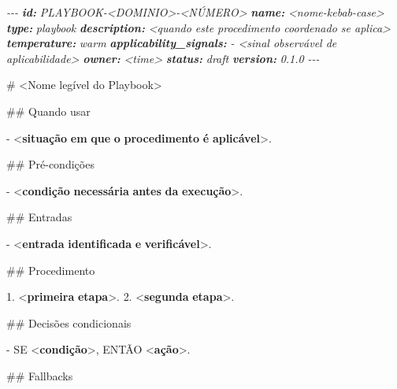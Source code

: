 \documentclass[
  10pt,
  a4paper,
  oneside]{book}
\newenvironment{Shaded}{}{}
\newcommand{\AnnotationTok}[1]{\textcolor[rgb]{0.38,0.63,0.69}{\textbf{\textit{#1}}}}
\newcommand{\CommentTok}[1]{\textcolor[rgb]{0.38,0.63,0.69}{\textit{#1}}}
\newcommand{\DataTypeTok}[1]{\textcolor[rgb]{0.56,0.13,0.00}{#1}}
\newcommand{\ErrorTok}[1]{\textcolor[rgb]{1.00,0.00,0.00}{\textbf{#1}}}
\newcommand{\FunctionTok}[1]{\textcolor[rgb]{0.02,0.16,0.49}{#1}}
\newcommand{\KeywordTok}[1]{\textcolor[rgb]{0.00,0.44,0.13}{\textbf{#1}}}
\newcommand{\NormalTok}[1]{#1}
\newcommand{\SpecialStringTok}[1]{\textcolor[rgb]{0.73,0.40,0.53}{#1}}
\renewenvironment{Shaded}{\begin{snugshade}}{\end{snugshade}}%
\begin{document}
\begin{Shaded}
\begin{Highlighting}[]
\CommentTok{{-}{-}{-}}
\AnnotationTok{id:}\CommentTok{ PLAYBOOK{-}\textless{}DOMINIO\textgreater{}{-}\textless{}NÚMERO\textgreater{}}
\AnnotationTok{name:}\CommentTok{ \textless{}nome{-}kebab{-}case\textgreater{}}
\AnnotationTok{type:}\CommentTok{ playbook}
\AnnotationTok{description:}\CommentTok{ \textless{}quando este procedimento coordenado se aplica\textgreater{}}
\AnnotationTok{temperature:}\CommentTok{ warm}
\AnnotationTok{applicability\_signals:}
\CommentTok{  {-} \textless{}sinal observável de aplicabilidade\textgreater{}}
\AnnotationTok{owner:}\CommentTok{ \textless{}time\textgreater{}}
\AnnotationTok{status:}\CommentTok{ draft}
\AnnotationTok{version:}\CommentTok{ 0.1.0}
\CommentTok{{-}{-}{-}}

\FunctionTok{\# \textless{}Nome legível do Playbook\textgreater{}}

\FunctionTok{\#\# Quando usar}

\SpecialStringTok{{-} }\DataTypeTok{\textless{}}\KeywordTok{situação} \ErrorTok{em} \ErrorTok{que} \ErrorTok{o} \ErrorTok{procedimento} \ErrorTok{é} \ErrorTok{aplicável}\DataTypeTok{\textgreater{}}\NormalTok{.}

\FunctionTok{\#\# Pré{-}condições}

\SpecialStringTok{{-} }\DataTypeTok{\textless{}}\KeywordTok{condição} \ErrorTok{necessária} \ErrorTok{antes} \ErrorTok{da} \ErrorTok{execução}\DataTypeTok{\textgreater{}}\NormalTok{.}

\FunctionTok{\#\# Entradas}

\SpecialStringTok{{-} }\DataTypeTok{\textless{}}\KeywordTok{entrada} \ErrorTok{identificada} \ErrorTok{e} \ErrorTok{verificável}\DataTypeTok{\textgreater{}}\NormalTok{.}

\FunctionTok{\#\# Procedimento}

\SpecialStringTok{1. }\DataTypeTok{\textless{}}\KeywordTok{primeira} \ErrorTok{etapa}\DataTypeTok{\textgreater{}}\NormalTok{.}
\SpecialStringTok{2. }\DataTypeTok{\textless{}}\KeywordTok{segunda} \ErrorTok{etapa}\DataTypeTok{\textgreater{}}\NormalTok{.}

\FunctionTok{\#\# Decisões condicionais}

\SpecialStringTok{{-} }\NormalTok{SE }\DataTypeTok{\textless{}}\KeywordTok{condição}\DataTypeTok{\textgreater{}}\NormalTok{, ENTÃO }\DataTypeTok{\textless{}}\KeywordTok{ação}\DataTypeTok{\textgreater{}}\NormalTok{.}

\FunctionTok{\#\# Fallbacks}


\end{Highlighting}
\end{Shaded}
\end{document}
